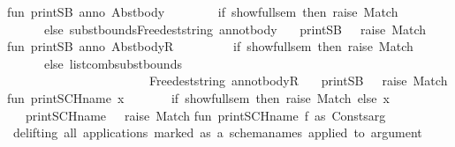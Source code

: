 \begin{isabellebody}
fun\ print{\isacharunderscore}SB{}\ {\isacharbrackleft}anno{\isacharcomma}\ Abs{\isacharparenleft}{\isacharunderscore}{\isacharcomma}t{\isacharcomma}body{\isacharparenright}{\isacharbrackright}\ {\isacharequal}\ \isanewline
\ \ \ \ \ \ if\ {\isacharbang}show{\isacharunderscore}full{\isacharunderscore}sem\ then\ {\isacharparenleft}raise\ Match{\isacharparenright}\ \isanewline
\ \ \ \ \ \ else\ {\isacharparenleft}subst{\isacharunderscore}bounds{\isacharparenleft}{\isacharbrackleft}Free{\isacharparenleft}dest{\isacharunderscore}string\ anno{\isacharcomma}t{\isacharparenright}{\isacharbrackright}{\isacharcomma}body{\isacharparenright}{\isacharparenright}\isanewline
\ \ \ {\isacharbar}print{\isacharunderscore}SB{}\ {\isacharunderscore}\ {\isacharequal}\ raise\ Match{\isacharsemicolon}\isanewline
\isanewline
\isanewline
\isanewline
fun\ print{\isacharunderscore}SB\ {\isacharparenleft}anno{\isacharcolon}{\isacharcolon}\ Abs{\isacharparenleft}{\isacharunderscore}{\isacharcomma}t{\isacharcomma}body{\isacharparenright}{\isacharcolon}{\isacharcolon}R{\isacharparenright}\ \ {\isacharequal}\ \isanewline
\ \ \ \ \ \ if\ {\isacharbang}show{\isacharunderscore}full{\isacharunderscore}sem\ then\ raise\ Match\isanewline
\ \ \ \ \ \ else\ {\isacharparenleft}list{\isacharunderscore}comb{\isacharparenleft}subst{\isacharunderscore}bounds\isanewline
\ \ \ \ \ \ \ \ \ \ \ \ \ \ \ \ \ \ \ \ \ \ \ {\isacharparenleft}{\isacharbrackleft}Free{\isacharparenleft}dest{\isacharunderscore}string\ anno{\isacharcomma}t{\isacharparenright}{\isacharbrackright}{\isacharcomma}body{\isacharparenright}{\isacharcomma}R{\isacharparenright}{\isacharparenright}\isanewline
\ \ \ {\isacharbar}print{\isacharunderscore}SB\ {\isacharunderscore}\ {\isacharequal}\ raise\ Match\isanewline
\isanewline
fun\ print{\isacharunderscore}SCH{\isacharunderscore}name{}\ {\isacharbrackleft}x{\isacharbrackright}\ {\isacharequal}\isanewline
\ \ \ \ \ \ if\ {\isacharbang}show{\isacharunderscore}full{\isacharunderscore}sem\ then\ raise\ Match\ else\ x\isanewline
\ \ \ {\isacharbar}print{\isacharunderscore}SCH{\isacharunderscore}name{}\ {\isacharunderscore}\ {\isacharequal}\ raise\ Match\isanewline
\isanewline
\isanewline
fun\ print{\isacharunderscore}SCH{\isacharunderscore}name\ {\isacharbrackleft}f\ as\ Const{\isacharparenleft}s{\isacharcomma}{\isacharunderscore}{\isacharparenright}{\isacharcomma}arg{\isacharbrackright}\ {\isacharequal}\isanewline
{\isacharparenleft}{\isacharasterisk}\ delifting\ all\ applications\ marked\ as\ a\ schema{\isacharminus}names\ applied\ to\ argument\isanewline

\end{isabellebody}
